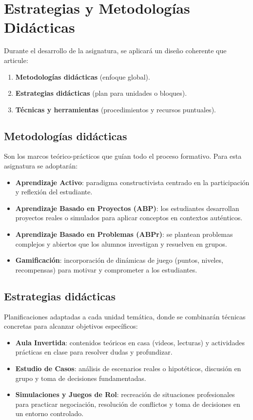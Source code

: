 \section{Estrategias y Metodologías Didácticas}
Durante el desarrollo de la asignatura, se aplicará un diseño coherente que articule:
\begin{enumerate}[leftmargin=*, itemsep=0.6em]
    \item \textbf{Metodologías didácticas} (enfoque global).
    \item \textbf{Estrategias didácticas} (plan para unidades o bloques).
    \item \textbf{Técnicas y herramientas} (procedimientos y recursos puntuales).
\end{enumerate}

\subsection*{Metodologías didácticas}
Son los marcos teórico-prácticos que guían todo el proceso formativo. Para esta asignatura se adoptarán:
\begin{itemize}[leftmargin=*, itemsep=0.6em]
    \item \textbf{Aprendizaje Activo}: paradigma constructivista centrado en la participación y reflexión del estudiante.
    \item \textbf{Aprendizaje Basado en Proyectos (ABP)}: los estudiantes desarrollan proyectos reales o simulados para aplicar conceptos en contextos auténticos.
    \item \textbf{Aprendizaje Basado en Problemas (ABPr)}: se plantean problemas complejos y abiertos que los alumnos investigan y resuelven en grupos.
    \item \textbf{Gamificación}: incorporación de dinámicas de juego (puntos, niveles, recompensas) para motivar y comprometer a los estudiantes.
\end{itemize}

\subsection*{Estrategias didácticas}
Planificaciones adaptadas a cada unidad temática, donde se combinarán técnicas concretas para alcanzar objetivos específicos:
\begin{itemize}[leftmargin=*, itemsep=0.6em]
    \item \textbf{Aula Invertida}: contenidos teóricos en casa (videos, lecturas) y actividades prácticas en clase para resolver dudas y profundizar.
    \item \textbf{Estudio de Casos}: análisis de escenarios reales o hipotéticos, discusión en grupo y toma de decisiones fundamentadas.
    \item \textbf{Simulaciones y Juegos de Rol}: recreación de situaciones profesionales para practicar negociación, resolución de conflictos y toma de decisiones en un entorno controlado.
\end{itemize}

